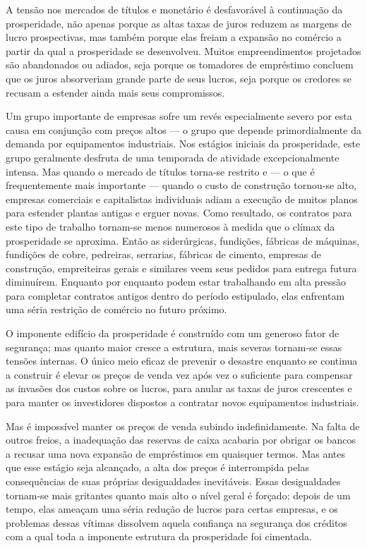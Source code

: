 \documentclass[12pt]{article}
\begin{document}
A tensão nos mercados de títulos e monetário é desfavorável à continuação da prosperidade, não apenas porque as altas taxas de juros reduzem as margens de lucro prospectivas, mas também porque elas freiam a expansão no comércio a partir da qual a prosperidade se desenvolveu. Muitos empreendimentos projetados são abandonados ou adiados, seja porque os tomadores de empréstimo concluem que os juros absorveriam grande parte de seus lucros, seja porque os credores se recusam a estender ainda mais seus compromissos.

Um grupo importante de empresas sofre um revés especialmente severo por esta causa em conjunção com preços altos — o grupo que depende primordialmente da demanda por equipamentos industriais. Nos estágios iniciais da prosperidade, este grupo geralmente desfruta de uma temporada de atividade excepcionalmente intensa. Mas quando o mercado de títulos torna-se restrito e — o que é frequentemente mais importante — quando o custo de construção tornou-se alto, empresas comerciais e capitalistas individuais adiam a execução de muitos planos para estender plantas antigas e erguer novas. Como resultado, os contratos para este tipo de trabalho tornam-se menos numerosos à medida que o clímax da prosperidade se aproxima. Então as siderúrgicas, fundições, fábricas de máquinas, fundições de cobre, pedreiras, serrarias, fábricas de cimento, empresas de construção, empreiteiras gerais e similares veem seus pedidos para entrega futura diminuírem. Enquanto por enquanto podem estar trabalhando em alta pressão para completar contratos antigos dentro do período estipulado, elas enfrentam uma séria restrição de comércio no futuro próximo.

O imponente edifício da prosperidade é construído com um generoso fator de segurança; mas quanto maior cresce a estrutura, mais severas tornam-se essas tensões internas. O único meio eficaz de prevenir o desastre enquanto se continua a construir é elevar os preços de venda vez após vez o suficiente para compensar as invasões dos custos sobre os lucros, para anular as taxas de juros crescentes e para manter os investidores dispostos a contratar novos equipamentos industriais.

Mas é impossível manter os preços de venda subindo indefinidamente. Na falta de outros freios, a inadequação das reservas de caixa acabaria por obrigar os bancos a recusar uma nova expansão de empréstimos em quaisquer termos. Mas antes que esse estágio seja alcançado, a alta dos preços é interrompida pelas consequências de suas próprias desigualdades inevitáveis. Essas desigualdades tornam-se mais gritantes quanto mais alto o nível geral é forçado; depois de um tempo, elas ameaçam uma séria redução de lucros para certas empresas, e os problemas dessas vítimas dissolvem aquela confiança na segurança dos créditos com a qual toda a imponente estrutura da prosperidade foi cimentada.
\end{document}
